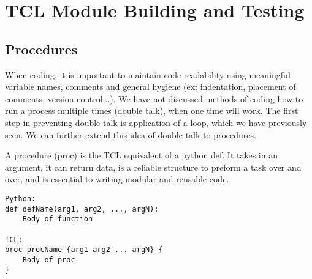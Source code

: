 \documentclass[letter,11pt]{article}
\begin{document}
\section{TCL Module Building and Testing}
\label{modbuild}
\subsection{Procedures}
\label{proc}

When coding, it is important to maintain code readability using meaningful variable names, comments and general hygiene (ex: indentation, placement of comments, version control...). We have not discussed methods of coding how to run a process multiple times (double talk), when one time will work. The first step in preventing double talk is application of a loop, which we have previously seen. We can further extend this idea of double talk to procedures. 

A procedure (proc) is the TCL equivalent of a python def. It takes in an argument, it can return data, is a reliable structure to preform a task over and over, and is essential to writing modular and reusable code.

\begin{lstlisting}
Python:
def defName(arg1, arg2, ..., argN):
	Body of function

TCL:
proc procName {arg1 arg2 ... argN} {
	Body of proc
}

\end{lstlisting}



\end{document}
